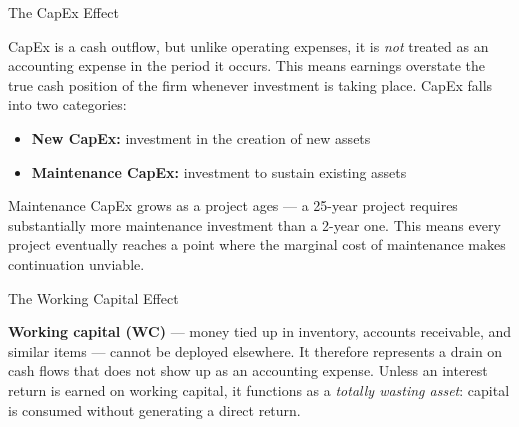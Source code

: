 \documentclass[10pt]{article}
\begin{document}
    \begin{core}{The CapEx Effect}

      CapEx is a cash outflow, but unlike operating expenses, it is \textit{not} treated as an accounting expense in the period it occurs. This means earnings overstate the true cash position of the firm whenever investment is taking place. CapEx falls into two categories:

      \begin{itemize}

        \item \textbf{New CapEx:} investment in the creation of new assets

        \item \textbf{Maintenance CapEx:} investment to sustain existing assets

      \end{itemize}

      Maintenance CapEx grows as a project ages — a 25-year project requires substantially more maintenance investment than a 2-year one. This means every project eventually reaches a point where the marginal cost of maintenance makes continuation unviable.


    \end{core}

    \begin{core}{The Working Capital Effect}

      \textbf{Working capital (WC)} — money tied up in inventory, accounts receivable, and similar items — cannot be deployed elsewhere. It therefore represents a drain on cash flows that does not show up as an accounting expense. Unless an interest return is earned on working capital, it functions as a \textit{totally wasting asset}: capital is consumed without generating a direct return.


    \end{core}
\end{document}

